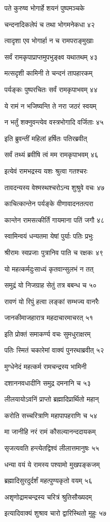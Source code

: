 पते कुरुष्व भोगार्हे शयनं पुष्पमञ्चके

चन्दनादिकलेपं च तथा भोगमनेकधा ४२

त्वादृशा एव भोगार्हा न च रामपराङ्मुखाः

सर्वं रामकृपाप्राप्तमुपभुङ्क्ष्व यथातथम् ४३

मत्सदृशी कामिनी ते चन्दनं तापहारकम्

पर्यङ्कः पुष्परचितः सर्वं रामकृपाभवम् ४४

ये रामं न भजिष्यन्ति ते नरा जठरं स्वयम्

न भर्तुं शक्नुवन्त्येव वस्त्रभोगादि वर्जिताः ४५

इति ब्रुवन्तीं महिलां हर्षितः पतिरब्रवीत्

सर्वं तथ्यं ब्रवीषि त्वं मम रामकृपाभवम् ४६

इत्येवं रामभद्रस्य यशः श्रुत्वा गतश्चरः

तावदन्यस्य वेश्मस्थश्चरोऽन्य शुश्रुवे वचः ४७

काचित्कान्तेन पर्यङ्के वीणावादनतत्परा

कान्तेन रामसत्कीर्तिं गायमाना पतिं जगौ ४८

स्वामिन्वयं धन्यतमा येषां पुर्याः पतिः प्रभुः

श्रीरामः स्वप्रजाः पुत्रानिव पाति च रक्षकः ४९

यो महत्कर्मदुःसाध्यं कृतवान्सुलभं न तत्

समुद्रं यो निजग्राह सेतुं तत्र बबन्ध च ५०

रावणं यो रिपुं हत्वा लङ्कां सम्भज्य वानरैः

जानकीमाजहारात्र महदाचारमाचरत् ५१

इति प्रोक्तं समाकर्ण्य वचः सुमधुराक्षरम्

पतिः स्मितं चकारेमां वाक्यं पुनरथाब्रवीत् ५२

मुग्धेनेदं महत्कर्म रामचन्द्रस्य भामिनी

दशाननवधादीनि समुद्र दमनानि च ५३

लीलयायोऽवनिं प्राप्तो ब्रह्मादिप्रार्थितो महान्

करोति सच्चरित्राणि महापापहराणि च ५४

मा जानीहि नरं रामं कौसल्यानन्ददायकम्

सृजत्यवति हन्त्येतद्विश्वं लीलात्तमानुषः ५५

धन्या वयं ये रामस्य पश्यामो मुखपङ्कजम्

ब्रह्मादिसुरदुर्दर्शं महत्पुण्यकृतो वयम् ५६

अशृणोद्रामचन्द्रस्य चरित्रं श्रुतिसौख्यदम्

इत्यादिवाक्यं शुश्राव चारो द्वारिस्थितो मुहुः ५७

